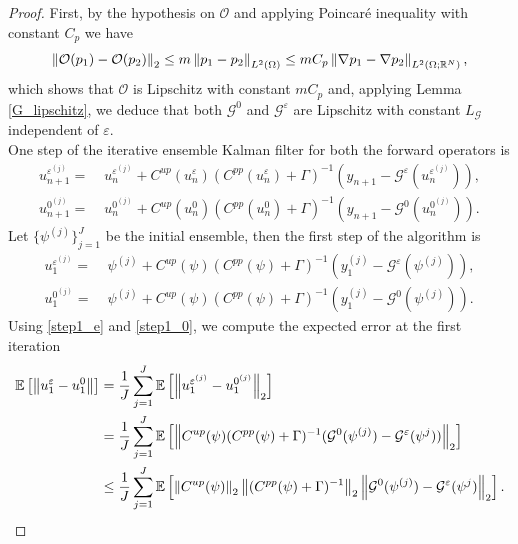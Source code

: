 \documentclass[10pt]{article}
\begin{document}
\begin{proof}
First, by the hypothesis on $\mathcal{O}$ and applying Poincar\'e inequality with constant $C_p$ we have
\begin{equation*}
\left\|\mathcal{O}(p_1) - \mathcal{O}(p_2)\right\|_2 \le m \left\|p_1 - p_2\right\|_{L^2(\Omega)} \le m C_p \left\|\nabla p_1 - \nabla p_2\right\|_{L^2(\Omega; \mathbb{R}^N)},
\end{equation*}
which shows that $\mathcal{O}$ is Lipschitz with constant $m C_p$ and, applying Lemma \ref{G_lipschitz}, we deduce that both $\mathcal{G}^0$ and $\mathcal{G}^{\varepsilon}$ are Lipschitz with constant $L_{\mathcal{G}}$ independent of $\varepsilon$. \\
One step of the iterative ensemble Kalman filter for both the forward operators is
\begin{align}
\label{stepn_e}
u_{n+1}^{\varepsilon^{(j)}} = & \; u_{n}^{\varepsilon^{(j)}} + C^{up}(u_n^{\varepsilon}) (C^{pp}(u_n^{\varepsilon}) + \Gamma)^{-1} (y_{n+1} - \mathcal{G}^{\varepsilon}(u_n^{\varepsilon^{(j)}})), \\
\label{stepn_0}
u_{n+1}^{0^{(j)}} = & \; u_{n}^{0^{(j)}} + C^{up}(u_n^{0}) (C^{pp}(u_n^{0}) + \Gamma)^{-1} (y_{n+1} - \mathcal{G}^{0}(u_n^{0^{(j)}})).
\end{align}
Let $\{ \psi^{(j)} \}_{j=1}^J$ be the initial ensemble, then the first step of the algorithm is
\begin{align}
\label{step1_e}
u_1^{\varepsilon^{(j)}} = & \; \psi^{(j)} + C^{up}(\psi) (C^{pp}(\psi) + \Gamma)^{-1} (y_1^{(j)} - \mathcal{G}^{\varepsilon}(\psi^{(j)})), \\
\label{step1_0}
u_1^{0^{(j)}} = & \; \psi^{(j)} + C^{up}(\psi) (C^{pp}(\psi) + \Gamma)^{-1} (y_1^{(j)} - \mathcal{G}^{0}(\psi^{(j)})).
\end{align}
Using \eqref{step1_e} and \eqref{step1_0}, we compute the expected error at the first iteration
\begin{align*}
\mathbb{E} \left [ \norm{u_1^{\varepsilon} - u_1^0} \right ] = & \; \frac{1}{J} \sum_{j=1}^J \mathbb{E} \left [ \norm{u_1^{\varepsilon^{(j)}} - u_1^{0^{(j)}}}_2 \right ] \\
= & \; \frac{1}{J} \sum_{j=1}^J \mathbb{E} \left [ \norm{C^{up}(\psi) (C^{pp}(\psi) + \Gamma)^{-1} (\mathcal{G}^0(\psi^{(j)}) - \mathcal{G}^{\varepsilon}(\psi^{j}))}_2 \right ] \\
\le & \; \frac{1}{J} \sum_{j=1}^J \mathbb{E} \left [ \norm{C^{up}(\psi)}_2 \norm{(C^{pp}(\psi) + \Gamma)^{-1}}_2 \norm{\mathcal{G}^0(\psi^{(j)}) - \mathcal{G}^{\varepsilon}(\psi^{j})}_2 \right ].

\end{align*}
\end{proof}
\end{document}
